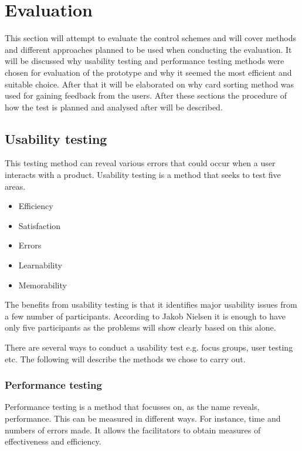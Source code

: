 \section{Evaluation}
This section will attempt to evaluate the control schemes and will cover methods and different approaches planned to be used when conducting the evaluation. 
It will be discussed why usability testing and performance testing methods were chosen for evaluation of the prototype and why it seemed the most efficient and suitable choice. After that it will be elaborated on why card sorting method was used for gaining feedback from the users. 
After these sections the procedure of how the test is planned and analysed after will be described. 

\subsection{Usability testing}

This testing method can reveal various errors that could occur when a user interacts with a product.
Usability testing is a method that seeks to test five areas. \cite{usability}

\begin{itemize}
\item Efficiency
\item Satisfaction
\item Errors
\item Learnability
\item Memorability
\end{itemize}

The benefits from usability testing is that it identifies major usability issues from a few number of participants. \cite{usability}
According to Jakob Nielsen it is enough to have only five participants as the problems will show clearly based on this alone. \cite{usability}

There are several ways to conduct a usability test e.g. focus groups, user testing etc.
The following will describe the methods we chose to carry out.

\subsubsection{Performance testing}

Performance testing is a method that focusses on, as the name reveals, performance. This can be measured in different ways. For instance, time and numbers of errors made.
It allows the facilitators to obtain measures of effectiveness and efficiency. \cite{performance}

